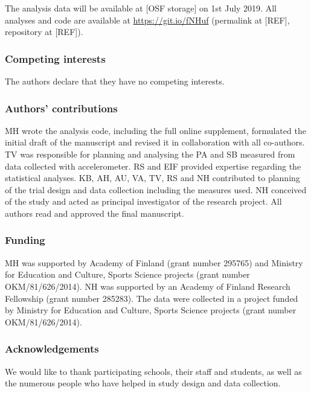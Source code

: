 \documentclass[english,man,floatsintext]{apa6}
\begin{document}
The analysis data will be available at {[}OSF storage{]} on 1st July 2019. All analyses and code are available at \url{https://git.io/fNHuf} (permalink at {[}REF{]}, repository at {[}REF{]}).

\hypertarget{competing-interests}{%
\subsubsection{Competing interests}\label{competing-interests}}

The authors declare that they have no competing interests.

\hypertarget{authors-contributions}{%
\subsubsection{Authors' contributions}\label{authors-contributions}}

MH wrote the analysis code, including the full online supplement, formulated the initial draft of the manuscript and revised it in collaboration with all co-authors. TV was responsible for planning and analysing the PA and SB measured from data collected with accelerometer. RS and EIF provided expertise regarding the statistical analyses. KB, AH, AU, VA, TV, RS and NH contributed to planning of the trial design and data collection including the measures used. NH conceived of the study and acted as principal investigator of the research project. All authors read and approved the final manuscript.

\hypertarget{funding}{%
\subsubsection{Funding}\label{funding}}

MH was supported by Academy of Finland (grant number 295765) and Ministry for Education and Culture, Sports Science projects (grant number OKM/81/626/2014). NH was supported by an Academy of Finland Research Fellowship (grant number 285283). The data were collected in a project funded by Ministry for Education and Culture, Sports Science projects (grant number OKM/81/626/2014).

\hypertarget{acknowledgements}{%
\subsubsection{Acknowledgements}\label{acknowledgements}}

We would like to thank participating schools, their staff and students, as well as the numerous people who have helped in study design and data collection.
\end{document}
